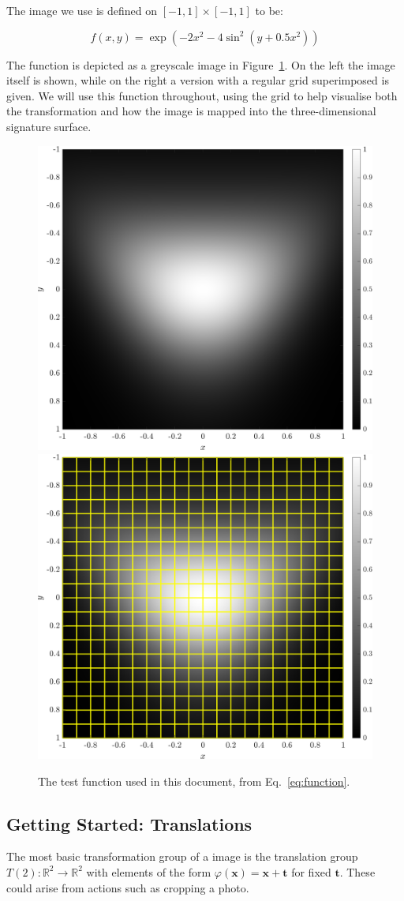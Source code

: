 \documentclass[review,onefignum,onetabnum]{siamonline190516}
\begin{document}
The image we use is defined on $[-1,1] \times [-1,1]$ to be:

\begin{equation}\label{eq:function}
f(x, y) = \exp(-2x^2 - 4\sin^2(y + 0.5x^2))
\end{equation}

The function is depicted as a greyscale image in Figure~\ref{fig:function}.
On the left the image itself is shown, while on the right a version with a
regular grid superimposed is given. We will use this function throughout,
using the grid to help visualise both the transformation and how the image
is mapped into the three-dimensional signature surface. 

\begin{figure}
  \centering
  \includegraphics[width=.45\textwidth]{Figs/function}
  \includegraphics[width=.45\textwidth]{Figs/function_scanlines}
  \caption{The test function used in this document, from
  Eq.~\eqref{eq:function}.}\label{fig:function}
\end{figure}

\subsection{Getting Started: Translations}
\label{sec:T2}

The most basic transformation group of a image is the translation group
$T(2) \colon \mathbb{R}^2 \to \mathbb{R}^2$ with elements of the form
$\varphi(\mathbf{x}) = \mathbf{x} + \mathbf{t}$ for fixed $\mathbf{t}$.
These could arise from actions such as cropping a photo.
\end{document}

